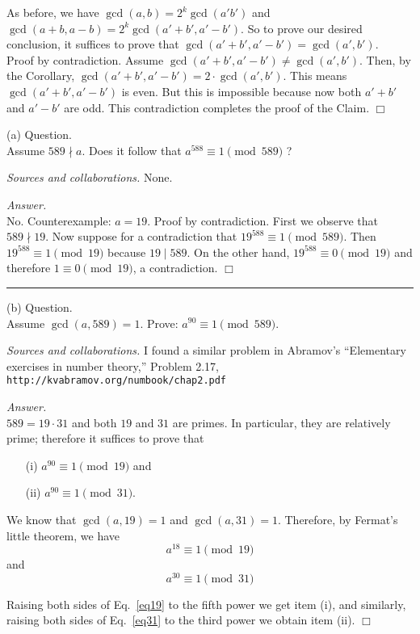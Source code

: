 \documentclass{amsart}
\begin{document}
\medskip\noindent
As before, we have $\gcd(a,b)=2^k\gcd(a'b')$ and
$\gcd(a+b,a-b)=2^k\gcd(a'+b',a'-b')$.  So to prove our
desired conclusion, it suffices to prove that
$\gcd(a'+b',a'-b')=\gcd(a',b')$.\\
Proof by contradiction.  Assume $\gcd(a'+b',a'-b')\neq\gcd(a',b')$.
Then, by the Corollary, $\gcd(a'+b',a'-b')= 2\cdot\gcd(a',b')$.
This means $\gcd(a'+b',a'-b')$ is even.  But this is impossible
because now both $a'+b'$ and $a'-b'$ are odd.
This contradiction completes the proof of the Claim.
\hfill $\Box$

\newpage
{}

 (a) Question.\\
Assume $589 \nmid a$.  Does it follow that $a^{588}\equiv 1\pmod{589}$ ?

\medskip\noindent
\emph{Sources and collaborations.}
None.

\medskip\noindent
\emph{Answer.} \\
No.  Counterexample: $a=19$.  Proof by contradiction.  First we
observe that $589 \nmid 19$.  Now
suppose for a contradiction that
$19^{588}\equiv 1 \pmod{589}$.  Then $19^{588}\equiv 1 \pmod{19}$
because $19\mid 589$.  On the other hand, $19^{588}\equiv 0 \pmod{19}$
and therefore $1\equiv 0 \pmod{19}$, a contradiction.
\hfill $\Box$

\bigskip\hrule
\vspace{0.5cm}

 (b) Question.\\
Assume $\gcd(a, 589)=1$.  Prove: $a^{90} \equiv 1 \pmod{589}$.

\medskip\noindent
\emph{Sources and collaborations.}
I found a similar problem in Abramov's
``Elementary exercises in number theory,'' Problem 2.17,\\
\verb>http://kvabramov.org/numbook/chap2.pdf>

\medskip\noindent
\emph{Answer.}\\
$589=19\cdot 31$ and both $19$ and $31$ are primes.  In particular,
they are relatively prime; therefore it suffices to prove that
\begin{itemize}
  \item[(i)] $a^{90} \equiv 1 \pmod{19}$ and
  \item[(ii)] $a^{90} \equiv 1 \pmod{31}$.
\end{itemize}
We know that $\gcd(a,19)=1$ and $\gcd(a,31)=1$.  Therefore,
by Fermat's little theorem, we have
\begin{equation}  \label{eq19}
  a^{18}\equiv 1\pmod{19}
\end{equation}
and
\begin{equation}  \label{eq31}
  a^{30}\equiv 1\pmod{31}
\end{equation}

Raising both sides of Eq.~\eqref{eq19} to the fifth power
we get item (i), and similarly, raising both sides of
Eq.~\eqref{eq31} to the third power we obtain item (ii).
\hfill $\Box$
\end{document}
